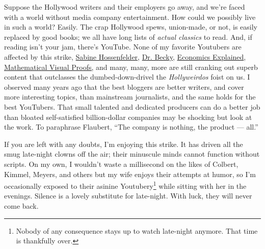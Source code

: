 Suppose the Hollywood writers and their employers go away, and we're
faced with a world without media company entertainment. How could we
possibly live in such a world? Easily. The crap Hollywood spews,
union-made, or not, is easily replaced by good books; we all have long
lists of \emph{actual classics} to read. And, if reading isn't your jam,
there's YouTube. None of my favorite Youtubers are affected by this
strike,
\href{https://www.youtube.com/c/SabineHossenfelder/videos}{Sabine
Hossenfelder},
\href{https://www.youtube.com/channel/UCYNbYGl89UUowy8oXkipC-Q}{Dr.
Becky},
\href{https://www.youtube.com/channel/UCZ4AMrDcNrfy3X6nsU8-rPg}{Economics
Explained},
\href{https://www.youtube.com/c/MicroVisualProofs}{Mathematical Visual
Proofs,} and many, many, more are still cranking out superb content that
outclasses the dumbed-down-drivel the \emph{Hollyweirdos} foist on us. I
observed many years ago that the best bloggers are better writers, and
cover more interesting topics, than mainstream journalists, and the same
holds for the best YouTubers. That small talented and dedicated
producers can do a better job than bloated self-satisfied billion-dollar
companies may be shocking but look at the work. To paraphrase Flaubert,
``The company is nothing, the product --- all.''

If you are left with any doubts, I'm enjoying this strike. It has driven
all the smug late-night clowns off the air; their minuscule minds cannot
function without scripts. On my own, I wouldn't waste a millisecond on
the likes of Colbert, Kimmel, Meyers, and others but my wife enjoys
their attempts at humor, so I'm occasionally exposed to their asinine
Youtubery\footnote{  Nobody of any consequence stays up to watch late-night anymore. That
  time is thankfully over.
} %
while sitting with her in the evenings. Silence is a lovely substitute
for late-night. With luck, they will never come back.

%



%
 
